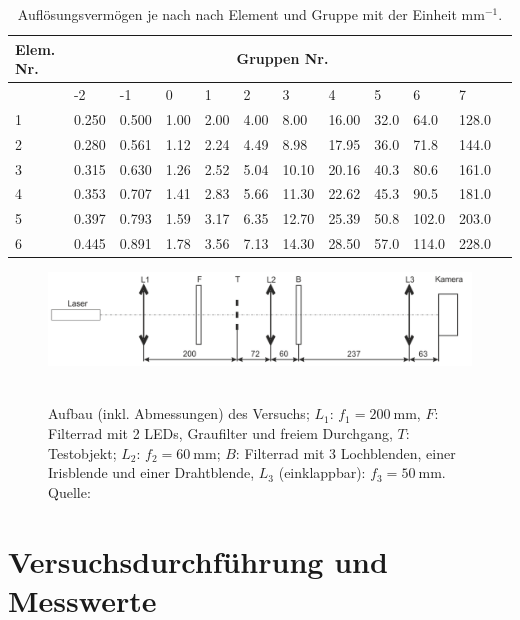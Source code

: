 \documentclass{article}
\begin{document}
\begin{table}[H]
\caption{Auflösungsvermögen je nach nach Element und Gruppe mit der Einheit mm$^{-1}$.}
\label{tab:aufl}
\begin{tabular}{|l||l|l|l|l|l|l|l|l|l|l|l|}
\hline
\textbf{Elem. Nr.} & \multicolumn{10}{|c|}{\textbf{Gruppen Nr.}}\\
\hline
& -2 & -1 & 0 & 1 & 2 & 3 & 4 & 5 & 6 & 7 \\
\hline
1 & 0.250 & 0.500 & 1.00 & 2.00 & 4.00 & 8.00 & 16.00 & 32.0 & 64.0 & 128.0 \\
\hline
2 & 0.280 & 0.561 & 1.12 & 2.24 & 4.49 & 8.98 & 17.95 & 36.0 & 71.8 & 144.0 \\
\hline
3 & 0.315 & 0.630 & 1.26 & 2.52 & 5.04 & 10.10 & 20.16 & 40.3 & 80.6 &  161.0 \\
\hline
4 & 0.353 & 0.707 & 1.41 & 2.83 & 5.66 & 11.30 & 22.62 & 45.3 & 90.5 & 181.0 \\
\hline
5 & 0.397 & 0.793 & 1.59 & 3.17 & 6.35 & 12.70 & 25.39 & 50.8 & 102.0 & 203.0 \\
\hline
6 & 0.445 & 0.891 & 1.78 & 3.56 & 7.13 & 14.30 & 28.50 & 57.0 & 114.0 & 228.0 \\
\hline
\end{tabular}
\end{table}






\begin{figure}[H]
\caption{Aufbau (inkl. Abmessungen) des Versuchs; $L_1$: $f_1= 200~$mm, $F$: Filterrad mit 2 LEDs, Graufilter und freiem Durchgang, $T$: Testobjekt; $L_2$: $f_2= 60~$mm; $B$: Filterrad mit 3 Lochblenden, einer Irisblende und einer Drahtblende, $L_3$ (einklappbar): $f_3= 50~$mm. Quelle: \cite{quelle6}}
\label{fig:usaf}
{\centering
\includegraphics[scale=1]{versuch.png}
~
}
\end{figure}








\section{Versuchsdurchführung und Messwerte}
\end{document}

